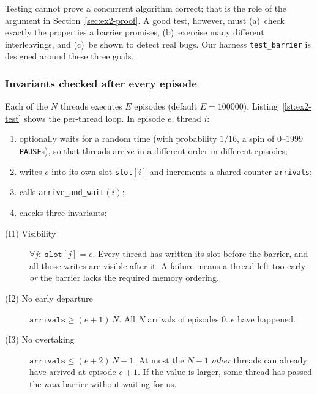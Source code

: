 Testing cannot prove a concurrent algorithm correct; that is the role of
the argument in Section~\ref{sec:ex2-proof}. A good test, however, must
(a)~check exactly the properties a barrier promises, (b)~exercise many
different interleavings, and (c)~be shown to detect real bugs. Our harness
\texttt{test\_barrier} is designed around these three goals.

\subsubsection{Invariants checked after every episode}

Each of the $N$ threads executes $E$ episodes (default
$E = \num{100000}$). Listing~\ref{lst:ex2-test} shows the per-thread loop.
In episode $e$, thread $i$:

\begin{enumerate}
    \item optionally waits for a random time (with probability $1/16$, a
          spin of $0$--$1999$ \texttt{PAUSE}s), so that threads arrive in a
          different order in different episodes;
    \item writes $e$ into its own slot \texttt{slot}$[i]$ and increments a
          shared counter \texttt{arrivals};
    \item calls \texttt{arrive\_and\_wait}$(i)$;
    \item checks three invariants:
\end{enumerate}

\begin{description}
    \item[(I1) Visibility] $\forall j:\ \texttt{slot}[j] = e$. Every thread
          has written its slot before the barrier, and all those writes are
          visible after it. A failure means a thread left too early
          \emph{or} the barrier lacks the required memory ordering.
    \item[(I2) No early departure] $\texttt{arrivals} \geq (e+1)\,N$. All
          $N$ arrivals of episodes $0..e$ have happened.
    \item[(I3) No overtaking] $\texttt{arrivals} \leq (e+2)\,N - 1$. At most
          the $N-1$ \emph{other} threads can already have arrived at episode
          $e+1$. If the value is larger, some thread has passed the
          \emph{next} barrier without waiting for us.
\end{description}

